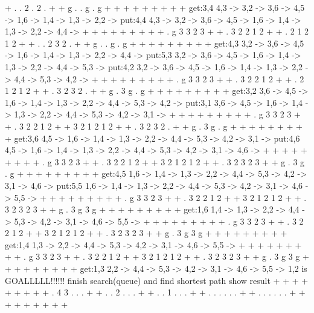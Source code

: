   +  .  .  2  .  2  .  +
  +  g  .  .  g  .  g  +
  +  +  +  +  +  +  +  +
get:3,4   4,3 -> 3,2 -> 3,6 -> 4,5 -> 1,6 -> 1,4 -> 1,3 -> 2,2 -> 
put:4,4   4,3 -> 3,2 -> 3,6 -> 4,5 -> 1,6 -> 1,4 -> 1,3 -> 2,2 -> 4,4 -> 
  +  +  +  +  +  +  +  +
  +  .  g  3  3  2  3  +
  +  .  3  2  2  1  2  +
  +  .  2  1  2  1  2  +
  +  .  .  2  3  2  .  +
  +  g  .  .  g  .  g  +
  +  +  +  +  +  +  +  +
get:4,3   3,2 -> 3,6 -> 4,5 -> 1,6 -> 1,4 -> 1,3 -> 2,2 -> 4,4 -> 
put:5,3   3,2 -> 3,6 -> 4,5 -> 1,6 -> 1,4 -> 1,3 -> 2,2 -> 4,4 -> 5,3 -> 
put:4,2   3,2 -> 3,6 -> 4,5 -> 1,6 -> 1,4 -> 1,3 -> 2,2 -> 4,4 -> 5,3 -> 4,2 -> 
  +  +  +  +  +  +  +  +
  +  .  g  3  3  2  3  +
  +  .  3  2  2  1  2  +
  +  .  2  1  2  1  2  +
  +  .  3  2  3  2  .  +
  +  g  .  3  g  .  g  +
  +  +  +  +  +  +  +  +
get:3,2   3,6 -> 4,5 -> 1,6 -> 1,4 -> 1,3 -> 2,2 -> 4,4 -> 5,3 -> 4,2 -> 
put:3,1   3,6 -> 4,5 -> 1,6 -> 1,4 -> 1,3 -> 2,2 -> 4,4 -> 5,3 -> 4,2 -> 3,1 -> 
  +  +  +  +  +  +  +  +
  +  .  g  3  3  2  3  +
  +  .  3  2  2  1  2  +
  +  3  2  1  2  1  2  +
  +  .  3  2  3  2  .  +
  +  g  .  3  g  .  g  +
  +  +  +  +  +  +  +  +
get:3,6   4,5 -> 1,6 -> 1,4 -> 1,3 -> 2,2 -> 4,4 -> 5,3 -> 4,2 -> 3,1 -> 
put:4,6   4,5 -> 1,6 -> 1,4 -> 1,3 -> 2,2 -> 4,4 -> 5,3 -> 4,2 -> 3,1 -> 4,6 -> 
  +  +  +  +  +  +  +  +
  +  .  g  3  3  2  3  +
  +  .  3  2  2  1  2  +
  +  3  2  1  2  1  2  +
  +  .  3  2  3  2  3  +
  +  g  .  3  g  .  g  +
  +  +  +  +  +  +  +  +
get:4,5   1,6 -> 1,4 -> 1,3 -> 2,2 -> 4,4 -> 5,3 -> 4,2 -> 3,1 -> 4,6 -> 
put:5,5   1,6 -> 1,4 -> 1,3 -> 2,2 -> 4,4 -> 5,3 -> 4,2 -> 3,1 -> 4,6 -> 5,5 -> 
  +  +  +  +  +  +  +  +
  +  .  g  3  3  2  3  +
  +  .  3  2  2  1  2  +
  +  3  2  1  2  1  2  +
  +  .  3  2  3  2  3  +
  +  g  .  3  g  3  g  +
  +  +  +  +  +  +  +  +
get:1,6   1,4 -> 1,3 -> 2,2 -> 4,4 -> 5,3 -> 4,2 -> 3,1 -> 4,6 -> 5,5 -> 
  +  +  +  +  +  +  +  +
  +  .  g  3  3  2  3  +
  +  .  3  2  2  1  2  +
  +  3  2  1  2  1  2  +
  +  .  3  2  3  2  3  +
  +  g  .  3  g  3  g  +
  +  +  +  +  +  +  +  +
get:1,4   1,3 -> 2,2 -> 4,4 -> 5,3 -> 4,2 -> 3,1 -> 4,6 -> 5,5 -> 
  +  +  +  +  +  +  +  +
  +  .  g  3  3  2  3  +
  +  .  3  2  2  1  2  +
  +  3  2  1  2  1  2  +
  +  .  3  2  3  2  3  +
  +  g  .  3  g  3  g  +
  +  +  +  +  +  +  +  +
get:1,3   2,2 -> 4,4 -> 5,3 -> 4,2 -> 3,1 -> 4,6 -> 5,5 -> 
1,2 is GOALLLLL!!!!!!
finish search(queue) and find shortest path
show result
  +  +  +  +  +  +  +  +
  +  .  4  3  .  .  .  +
  +  .  .  2  .  .  .  +
  +  .  .  1  .  .  .  +
  +  .  .  .  .  .  .  +
  +  .  .  .  .  .  .  +
  +  +  +  +  +  +  +  +

